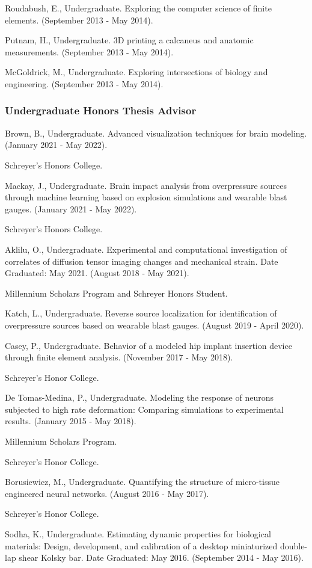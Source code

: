 \documentclass[a4paper,10pt]{article}
\begin{document}
Roudabush, E., Undergraduate. Exploring the computer science of finite elements. (September 2013 - May 2014).

Putnam, H., Undergraduate. 3D printing a calcaneus and anatomic measurements. (September 2013 - May 2014).

McGoldrick, M., Undergraduate. Exploring intersections of biology and engineering. (September 2013 - May 2014).



\subsubsection*{Undergraduate Honors Thesis Advisor}
Brown, B., Undergraduate. Advanced visualization techniques for brain modeling. (January 2021 - May 2022).

Schreyer's Honors College.

Mackay, J., Undergraduate. Brain impact analysis from overpressure sources through machine learning based on explosion simulations and wearable blast gauges. (January 2021 - May 2022).

Schreyer's Honors College.

Aklilu, O., Undergraduate. Experimental and computational investigation of correlates of diffusion tensor imaging changes and mechanical strain. Date Graduated: May 2021. (August 2018 - May 2021).

Millennium Scholars Program and Schreyer Honors Student.

Katch, L., Undergraduate. Reverse source localization for identification of overpressure sources based on wearable blast gauges. (August 2019 - April 2020).

Casey, P., Undergraduate. Behavior of a modeled hip implant insertion device through finite element analysis. (November 2017 - May 2018).

Schreyer's Honor College.

De Tomas-Medina, P., Undergraduate. Modeling the response of neurons subjected to high rate deformation: Comparing simulations to experimental results. (January 2015 - May 2018).

Millennium Scholars Program.

Schreyer's Honor College.

Borusiewicz, M., Undergraduate. Quantifying the structure of micro-tissue engineered neural networks. (August 2016 - May 2017).

Schreyer's Honor College.

Sodha, K., Undergraduate. Estimating dynamic properties for biological materials: Design, development, and calibration of a desktop miniaturized double-lap shear Kolsky bar. Date Graduated: May 2016. (September 2014 - May 2016).
\end{document}
